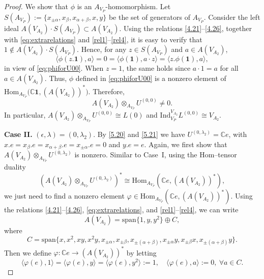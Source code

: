 \documentclass[12pt,a4paper,reqno]{amsart}
\numberwithin{equation}{section}
\numberwithin{equation}{section}
\theoremstyle{definition}
\def \C {\mathbb{C}}
\def \vac {\mathbf{1}}
\def \Hom {\mathrm{Hom}}
\def\Ind{\mathrm{Ind}}
\def\Ind{\mathrm{Ind}}
\begin{document}
\begin{proof}
			We show that $\phi$ is an $A_{V_P}$-homomorphism. 
			Let 
			$S(A_{V_P}) := \{ x_{\pm\alpha}, x_{\beta}, x_{\alpha+\beta}, x, y \}$ 
			be the set of generators of $A_{V_P}$. 
			Consider the left ideal $A(V_{A_2}) \cdot S(A_{V_P}) \subset A(V_{A_2})$. 
			Using the relations \eqref{4.21}--\eqref{4.26}, together with 
			\eqref{eq:extrarelations} and \eqref{rel1}--\eqref{rel4}, 
			it is easy to verify that $1 \notin A(V_{A_2}) \cdot S(A_{V_P})$. 
			Hence, for any $z \in S(A_{V_P})$ and $a \in A(V_{A_2})$,
			\begin{equation}\label{eq:propertyforphi}
				\langle \phi(z.\vac), a \rangle 
				= 0 
				= \langle \phi(\vac), a \cdot z \rangle
				= \langle z.\phi(\vac), a \rangle,
			\end{equation}
			in view of \eqref{eq:phiforU00}. 
			When $z = 1$, the same holds since $a \cdot 1 = a$ for all $a \in A(V_{A_2})$.
			Thus, $\phi$ defined in \eqref{eq:phiforU00} is a nonzero element of 
			$\Hom_{A_{V_P}}\!\big(\C \vac, (A(V_{A_2}))^{\!*}\big)$.
			Therefore,
			\[
			A(V_{A_2}) \otimes_{A_{V_P}} U^{(0,0)} \neq 0.
			\]
			In particular,
			$
			A(V_{A_2}) \otimes_{A_{V_P}} U^{(0,0)} 
			\cong L(0)$ and
			$
			\Ind^{V_{A_2}}_{V_P}L^{(0,0)} 
			\cong V_{A_2}.
			$
			
			
			\noindent	\textbf{Case II.} $(\epsilon, \lambda) = (0, \lambda_2)$. 
			By \eqref{5.20} and \eqref{5.21} we have $U^{(0, \lambda_2)} = \C e$, with 
			$x.e = x_{\beta}.e = x_{\alpha+\beta}.e = x_{\pm \alpha}.e = 0$ and $y.e = e$. 
			Again, we first show that $A(V_{A_2}) \otimes_{A_{V_P}} U^{(0, \lambda_2)}$ is nonzero. 
			Similar to Case~I, using the Hom–tensor duality
			\[
			\left(A(V_{A_2}) \otimes_{A_{V_P}} U^{(0, \lambda_2)}\right)^\ast 
			\cong \Hom_{A_{V_P}}(\C e, (A(V_{A_2}))^\ast),
			\]
			we just need to find a nonzero element 
			$\varphi \in \Hom_{A_{V_P}}(\C e, (A(V_{A_2}))^\ast)$. 
			Using the relations \eqref{4.21}--\eqref{4.26}, \eqref{eq:extrarelations}, and \eqref{rel1}--\eqref{rel4}, 
			we can write 
			\[
			A(V_{A_2}) = \mathrm{span}\{1, y, y^2\} \oplus C,
			\]
			where
			\[
			C = \mathrm{span}\{x, x^2, xy, x^2y, x_{\pm \alpha}, x_{\pm \beta}, x_{\pm (\alpha+\beta)}, 
			x_{\pm \alpha}y, x_{\pm \beta}x, x_{\pm (\alpha+\beta)}y\}.
			\]
			Then we define $\varphi : \C e \to (A(V_{A_2}))^\ast$ by letting
			\begin{equation}\label{eq:varphiforU0la2}
				\langle \varphi(e), 1 \rangle = \langle \varphi(e), y \rangle = \langle \varphi(e), y^2 \rangle := 1, 
				\quad 
				\langle \varphi(e), a \rangle := 0, \ \forall a \in C.
			\end{equation}
			

\end{proof}
\end{document}
